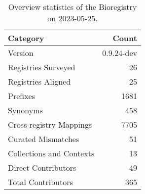 \begin{table}
\caption{Overview statistics of the Bioregistry on 2023-05-25.}
\label{tab:bioregistry-summary}
\begin{tabular}{lr}
\toprule
Category & Count \\
\midrule
Version & 0.9.24-dev \\
Registries Surveyed & 26 \\
Registries Aligned & 25 \\
Prefixes & 1681 \\
Synonyms & 458 \\
Cross-registry Mappings & 7705 \\
Curated Mismatches & 51 \\
Collections and Contexts & 13 \\
Direct Contributors & 49 \\
Total Contributors & 365 \\
\bottomrule
\end{tabular}
\end{table}
